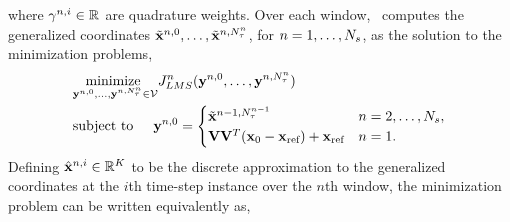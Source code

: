 where $\gamma^{n,i} \in \mathbb{R}^{}$ are quadrature weights. 
Over each window, \methodAcronym\ computes the generalized coordinates $\tilde{\mathbf{x}}^{n,0},\ldots,\tilde{\mathbf{x}}^{n,N_{\tau}^{n}}$, for $n=1,\ldots,N_s$, as the solution to the minimization problems,
\begin{align*}
&\underset{\mathbf{y}^{n,0},\ldots,\mathbf{y}^{n,N_{\tau}^{n}} \in \mathcal{V }}{\text{minimize } }
J_{LMS}^{n} (\mathbf{y}^{n,0},\ldots,\mathbf{y}^{n,N_{\tau}^{n}}) \\
& \text{subject to} \hspace{0.2 in}  \mathbf{y}^{n,0} =
\begin{cases} \tilde{\mathbf{x}}^{n-1,N_{\tau}^{n-1}} & n = 2,\ldots,N_s,\\
\mathbf {V} \mathbf {V}^T ({{\mathbf{x}}_0} - \mathbf{x}_\text{ref}) + \mathbf{x}_\text{ref} & n=1. \end{cases} \end{align*}
Defining $\hat{\mathbf{x}}^{n,i} \in \mathbb{R}^{K}$ to be the discrete approximation to the generalized coordinates at the $i$th time-step instance over the $n$th window, 
the minimization problem can be written equivalently as,
